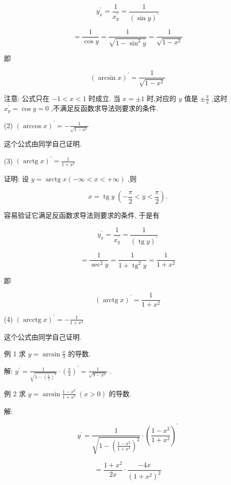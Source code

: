\documentclass[10pt]{article}
\begin{document}
\[
{y}_{x}^{\prime } = \frac{1}{{x}_{y}^{\prime }} = \frac{1}{{\left( \sin y\right) }^{\prime }}
\]

\[
= \frac{1}{\cos y} = \frac{1}{\sqrt{1 - {\sin }^{2}y}} = \frac{1}{\sqrt{1 - {x}^{2}}}
\]

即

\[
{\left( \arcsin x\right) }^{\prime } = \frac{1}{\sqrt{1 - {x}^{2}}}
\]

注意: 公式只在 \(- 1 < x < 1\) 时成立. 当 \(x = \pm 1\) 时,对应的 \(y\) 值是 \(\pm \frac{\pi }{2}\) ,这时 \({x}_{y}^{\prime } = \cos y = 0\) ,不满足反函数求导法则要求的条件.

(2) \({\left( \arccos x\right) }^{\prime } = - \frac{1}{\sqrt{1 - {x}^{2}}}\)

这个公式由同学自己证明.

(3) \({\left( \operatorname{arctg}x\right) }^{\prime } = \frac{1}{1 + {x}^{2}}\)

证明: 设 \(y = \operatorname{arctg}x\left( {-\infty < x < + \infty }\right)\) ,则

\[
x = \operatorname{tg}y\;\left( {-\frac{\pi }{2} < y < \frac{\pi }{2}}\right) .
\]

容易验证它满足反函数求导法则要求的条件, 于是有

\[
{y}_{x}^{\prime } = \frac{1}{{x}_{y}^{\prime }} = \frac{1}{{\left( \operatorname{tg}y\right) }^{\prime }}
\]

\[
= \frac{1}{{\sec }^{2}y} = \frac{1}{1 + {\operatorname{tg}}^{2}y} = \frac{1}{1 + {x}^{2}}
\]

即

\[
{\left( \operatorname{arctg}x\right) }^{\prime } = \frac{1}{1 + {x}^{2}}
\]

(4) \({\left( \operatorname{arcctg}x\right) }^{\prime } = - \frac{1}{1 + {x}^{2}}\)

这个公式由同学自己证明.

例 1 求 \(y = \arcsin \frac{x}{3}\) 的导数.

解: \({y}^{\prime } = \frac{1}{\sqrt{1 - {\left( \frac{x}{3}\right) }^{2}}} \cdot {\left( \frac{x}{3}\right) }^{\prime } = \frac{1}{\sqrt{9 - {x}^{2}}}\) .

例 2 求 \(y = \arcsin \frac{1 - {x}^{2}}{1 + {x}^{2}}\;\left( {x > 0}\right)\) 的导数.

解:

\[
{y}^{\prime } = \frac{1}{\sqrt{1 - {\left( \frac{1 - {x}^{2}}{1 + {x}^{2}}\right) }^{2}}} \cdot {\left( \frac{1 - {x}^{2}}{1 + {x}^{2}}\right) }^{\prime }
\]

\[
= \frac{1 + {x}^{2}}{2x} \cdot \frac{-{4x}}{{\left( 1 + {x}^{2}\right) }^{2}}
\]
\end{document}
